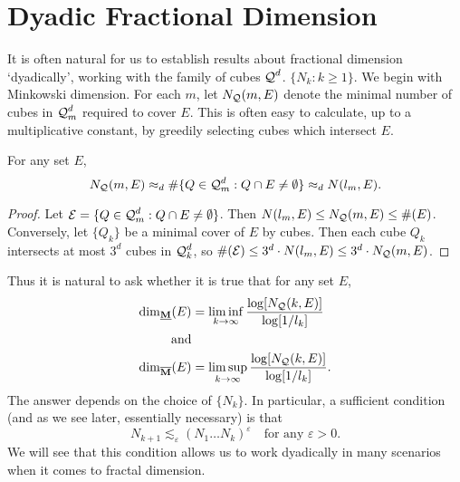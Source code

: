 \section{Dyadic Fractional Dimension}

It is often natural for us to establish results about fractional dimension `dyadically', working with the family of cubes $\operatorname{\mathcal{Q}}^d$. $\{ N_k : k \geq 1 \}$. We begin with Minkowski dimension. For each $m$, let $N_{\operatorname{\mathcal{Q}}}(m,E)$ denote the minimal number of cubes in $\operatorname{\mathcal{Q}}_m^d$ required to cover $E$. This is often easy to calculate, up to a multiplicative constant, by greedily selecting cubes which intersect $E$.

\begin{lemma} \label{comparableCovers}
	For any set $E$,
	\[ N_{\operatorname{\mathcal{Q}}}(m,E) \approx_d \# \{ Q \in \operatorname{\mathcal{Q}}_m^d : Q \cap E \neq \emptyset \} \approx_d N(l_m,E). \]
\end{lemma}
\begin{proof}
	Let $\mathcal{E} = \{ Q \in \operatorname{\mathcal{Q}}_m^d : Q \cap E \neq \emptyset \}$. Then $N(l_m,E) \leq N_{\operatorname{\mathcal{Q}}}(m,E) \leq \#(E)$. Conversely, let $\{ Q_k \}$ be a minimal cover of $E$ by cubes. Then each cube $Q_k$ intersects at most $3^d$ cubes in $\operatorname{\mathcal{Q}}_k^d$, so $\#(\mathcal{E}) \leq 3^d \cdot N(l_m,E) \leq 3^d \cdot N_{\operatorname{\mathcal{Q}}}(m,E)$.
\end{proof}

Thus it is natural to ask whether it is true that for any set $E$,
%
\begin{equation} \label{definingSequence}
	\begin{aligned}
		\operatorname{\dim_{\underline{\mathbf{M}}}}(E) &= \liminf_{k \to \infty} \frac{\log[N_{\operatorname{\mathcal{Q}}}(k,E)]}{\log[1/l_k]}\\
		\text{and}\\
		\operatorname{\dim_{\overline{\mathbf{M}}}}(E) &= \limsup_{k \to \infty} \frac{\log[N_{\operatorname{\mathcal{Q}}}(k,E)]}{\log[1/l_k]}.
	\end{aligned}
\end{equation}
%
The answer depends on the choice of $\{ N_k \}$. In particular, a sufficient condition (and as we see later, essentially necessary) is that
%
\begin{equation} \label{definingsequencegrowthrate}
	N_{k+1} \lesssim_\varepsilon (N_1 \dots N_k)^\varepsilon \quad \text{for any $\varepsilon > 0$}.
\end{equation}
%
We will see that this condition allows us to work dyadically in many scenarios when it comes to fractal dimension.

%
%

